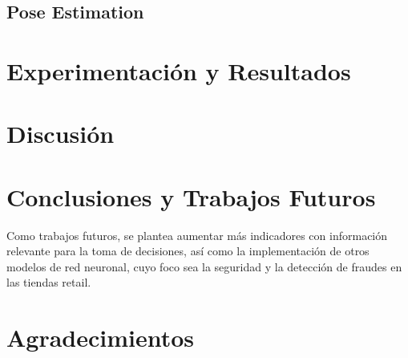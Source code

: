 \documentclass[conference]{IEEEtran}
\begin{document}
\subsection{Pose Estimation}


\section{Experimentación y Resultados}

\section{Discusión}

\section{Conclusiones y Trabajos Futuros}

Como trabajos futuros, se plantea aumentar más indicadores con información relevante para la toma de decisiones, así como la implementación de otros modelos de red neuronal, cuyo foco sea la seguridad y la detección de fraudes en las tiendas retail.

\section*{Agradecimientos}



\end{document}
